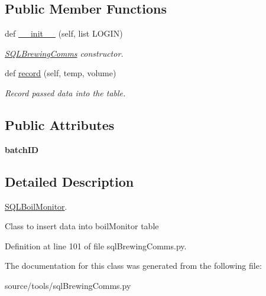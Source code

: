 \subsection*{Public Member Functions}
\begin{DoxyCompactItemize}
\item 
\mbox{\label{classsql_brewing_comms_1_1_s_q_l_boil_monitor_aa4bfd9a0451931b059b89b7d39e53dae}} 
def \mbox{\hyperlink{classsql_brewing_comms_1_1_s_q_l_boil_monitor_aa4bfd9a0451931b059b89b7d39e53dae}{\+\_\+\+\_\+init\+\_\+\+\_\+}} (self, list L\+O\+G\+IN)
\begin{DoxyCompactList}\small\item\em \mbox{\hyperlink{classsql_brewing_comms_1_1_s_q_l_brewing_comms}{S\+Q\+L\+Brewing\+Comms}} constructor. \end{DoxyCompactList}\item 
\mbox{\label{classsql_brewing_comms_1_1_s_q_l_boil_monitor_a6d40fce0faf68b9013db2b44bced7125}} 
def \mbox{\hyperlink{classsql_brewing_comms_1_1_s_q_l_boil_monitor_a6d40fce0faf68b9013db2b44bced7125}{record}} (self, temp, volume)
\begin{DoxyCompactList}\small\item\em Record passed data into the table. \end{DoxyCompactList}\end{DoxyCompactItemize}
\subsection*{Public Attributes}
\begin{DoxyCompactItemize}
\item 
\mbox{\label{classsql_brewing_comms_1_1_s_q_l_boil_monitor_ae999848b385c73d2563d9f8eddc5bf7b}} 
{\bfseries batch\+ID}
\end{DoxyCompactItemize}


\subsection{Detailed Description}
\mbox{\hyperlink{classsql_brewing_comms_1_1_s_q_l_boil_monitor}{S\+Q\+L\+Boil\+Monitor}}. 

Class to insert data into boil\+Monitor table 

Definition at line 101 of file sql\+Brewing\+Comms.\+py.



The documentation for this class was generated from the following file\+:\begin{DoxyCompactItemize}
\item 
source/tools/sql\+Brewing\+Comms.\+py\end{DoxyCompactItemize}
